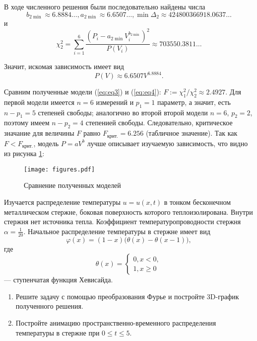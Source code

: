 В ходе численного решения были последовательно найдены числа
\[ b_{2 \min} \approx 6.8884\ldots, a_{2 \min} \approx  6.6507\ldots, \min \Delta _2 \approx 424800366918.0637\ldots \]
и
\[ \chi _2^2 = \sum \limits _{i=1}^6 \dfrac{(P_i - a_{2 \min} V_i^{b_{2 \min}})^2}{P(V_i)} \approx 703550.3811\ldots \]

Значит, искомая зависимость имеет вид
\begin{equation} \label{eq:eq4}
P(V) \approx 6.6507 V^{6.8884}.
\end{equation}

Сравним полученные модели (\ref{eq:eq3}) и (\ref{eq:eq4}):
$ F := \chi _1^2 / \chi _2^2 \approx 2.4927.$ 
Для первой модели имеется $n=6$ измерений и $p_1 = 1$ параметр, а значит, есть $n-p_1 = 5$ степеней свободы; аналогично во второй второй модели $n=6$, $p_2 = 2$, поэтому имеем $n-p_2 = 4$ степенией свободы. Следовательно, критическое значание для величины $F$ равно $F_{\text{крит.}} = 6.256$ (табличное значение). Так как $F < F_{\text{крит.}}$, модель $P = aV^b$ лучше описывает изучаемую зависимость, что видно из рисунка \ref{fig:fig-2}:

\begin{figure}[h]
\centering
\texttt{[image: figures.pdf]}
\caption{Сравнение полученных моделей}
\label{fig:fig-2}
\end{figure}

 Изучается распределение температуры $u=u(x, t)$ в тонком бесконечном металлическом стержне, боковая поверхность которого теплоизолирована. Внутри стержня нет источника тепла. Коэффициент температуропроводности стержня $\alpha = \frac{1}{20}$. Начальное распределение температуры в стержне имеет вид
\[
\varphi (x)=(1-x)\big(\theta (x)- \theta (x-1)\big),
\]
где 
\[
\theta (x) =
\begin{cases}
0, x < 0,\\
1, x \ge 0
\end{cases}
\]
--- ступенчатая функция Хевисайда.\\

 \begin{enumerate}
\item Решите задачу с помощью преобразования Фурье и постройте 3D-график полученного решения.
\item Постройте анимацию пространственно-временного распределения температуры в стержне при $0 \le t \le 5$.
\end{enumerate}

